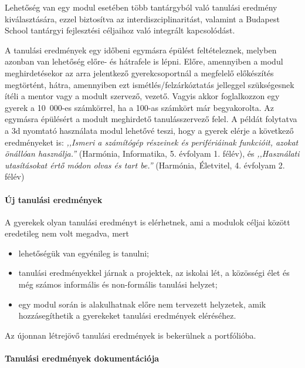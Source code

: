 Lehetőség van egy modul esetében több tantárgyból való tanulási eredmény kiválasztására, ezzel biztosítva az interdiszciplinaritást, valamint a Budapest School tantárgyi fejlesztési céljaihoz való integrált kapcsolódást.

A tanulási eredmények egy időbeni egymásra épülést feltételeznek, melyben azonban van lehetőség előre- és hátrafele is lépni. Előre, amennyiben a modul meghirdetésekor az arra jelentkező gyerekcsoportnál a megfelelő előkészítés megtörtént, hátra, amennyiben ezt ismétlés/felzárkóztatás jelleggel szükségesnek ítéli a mentor vagy a modult szervező, vezető. Vagyis akkor foglalkozzon egy gyerek a 10~000-es számkörrel, ha a 100-as számkört már begyakorolta. Az egymásra épülésért a modult meghirdető tanulásszervező felel. A példát folytatva a 3d nyomtató használata modul lehetővé teszi, hogy a gyerek elérje a következő eredményeket is: \emph{,,Ismeri a számítógép
      részeinek és perifériáinak funkcióit, azokat önállóan használja.''}
(Harmónia, Informatika, 5. évfolyam 1. félév), és  \emph{,,Használati utasításokat
      értő módon olvas és tart be.''} (Harmónia, Életvitel, 4. évfolyam 2. félév)

\paragraph{Új tanulási eredmények}

A gyerekek olyan tanulási eredményt is elérhetnek, ami a modulok céljai között eredetileg nem volt megadva, mert

\begin{itemize}
      \item lehetőségük van egyénileg is tanulni;

      \item tanulási eredményekkel járnak a projektek, az iskolai lét, a közösségi élet és még számos informális és non-formális tanulási helyzet;

      \item egy modul során is alakulhatnak előre nem tervezett helyzetek, amik hozzásegíthetik a gyerekeket tanulási eredmények eléréséhez.
\end{itemize}

Az újonnan létrejövő tanulási eredmények is bekerülnek a portfólióba.

\paragraph{Tanulási eredmények dokumentációja}

